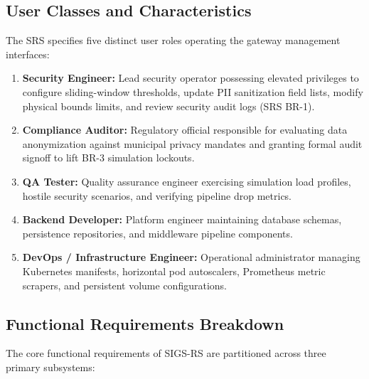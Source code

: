 \documentclass[a4paper]{article}
\begin{document}
\subsection{User Classes and Characteristics}
The SRS specifies five distinct user roles operating the gateway management interfaces:
\begin{enumerate}[label=\textbf{\arabic*.}]
    \item \textbf{Security Engineer:} Lead security operator possessing elevated privileges to configure sliding-window thresholds, update PII sanitization field lists, modify physical bounds limits, and review security audit logs (SRS BR-1).
    \item \textbf{Compliance Auditor:} Regulatory official responsible for evaluating data anonymization against municipal privacy mandates and granting formal audit signoff to lift BR-3 simulation lockouts.
    \item \textbf{QA Tester:} Quality assurance engineer exercising simulation load profiles, hostile security scenarios, and verifying pipeline drop metrics.
    \item \textbf{Backend Developer:} Platform engineer maintaining database schemas, persistence repositories, and middleware pipeline components.
    \item \textbf{DevOps / Infrastructure Engineer:} Operational administrator managing Kubernetes manifests, horizontal pod autoscalers, Prometheus metric scrapers, and persistent volume configurations.
\end{enumerate}

\subsection{Functional Requirements Breakdown}
The core functional requirements of SIGS-RS are partitioned across three primary subsystems:
\end{document}

